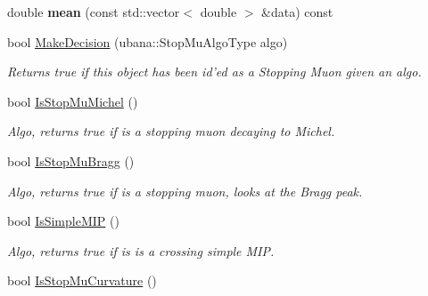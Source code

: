 \begin{DoxyCompactItemize}
\item 
\hypertarget{classubana_1_1StoppingMuonTaggerHelper_ae91e9aa900337fdda6efc20197fae907}{double {\bfseries mean} (const std\-::vector$<$ double $>$ \&data) const }\label{classubana_1_1StoppingMuonTaggerHelper_ae91e9aa900337fdda6efc20197fae907}

\item 
\hypertarget{classubana_1_1StoppingMuonTaggerHelper_af00c8b25be8b4f8bed8a0110133cef32}{bool \hyperlink{classubana_1_1StoppingMuonTaggerHelper_af00c8b25be8b4f8bed8a0110133cef32}{Make\-Decision} (ubana\-::\-Stop\-Mu\-Algo\-Type algo)}\label{classubana_1_1StoppingMuonTaggerHelper_af00c8b25be8b4f8bed8a0110133cef32}

\begin{DoxyCompactList}\small\item\em Returns true if this object has been id'ed as a Stopping Muon given an algo. \end{DoxyCompactList}\item 
\hypertarget{classubana_1_1StoppingMuonTaggerHelper_a577c1e215894beade40f3016f1281a2a}{bool \hyperlink{classubana_1_1StoppingMuonTaggerHelper_a577c1e215894beade40f3016f1281a2a}{Is\-Stop\-Mu\-Michel} ()}\label{classubana_1_1StoppingMuonTaggerHelper_a577c1e215894beade40f3016f1281a2a}

\begin{DoxyCompactList}\small\item\em Algo, returns true if is a stopping muon decaying to Michel. \end{DoxyCompactList}\item 
\hypertarget{classubana_1_1StoppingMuonTaggerHelper_a3ca72062c233ffa1dea221ceecebea25}{bool \hyperlink{classubana_1_1StoppingMuonTaggerHelper_a3ca72062c233ffa1dea221ceecebea25}{Is\-Stop\-Mu\-Bragg} ()}\label{classubana_1_1StoppingMuonTaggerHelper_a3ca72062c233ffa1dea221ceecebea25}

\begin{DoxyCompactList}\small\item\em Algo, returns true if is a stopping muon, looks at the Bragg peak. \end{DoxyCompactList}\item 
\hypertarget{classubana_1_1StoppingMuonTaggerHelper_a1b584e720c5a745f8b170139c1c6910b}{bool \hyperlink{classubana_1_1StoppingMuonTaggerHelper_a1b584e720c5a745f8b170139c1c6910b}{Is\-Simple\-M\-I\-P} ()}\label{classubana_1_1StoppingMuonTaggerHelper_a1b584e720c5a745f8b170139c1c6910b}

\begin{DoxyCompactList}\small\item\em Algo, returns true if is is a crossing simple M\-I\-P. \end{DoxyCompactList}\item 
\hypertarget{classubana_1_1StoppingMuonTaggerHelper_a7d10fc24ede20dfcf7474794c5c24746}{bool \hyperlink{classubana_1_1StoppingMuonTaggerHelper_a7d10fc24ede20dfcf7474794c5c24746}{Is\-Stop\-Mu\-Curvature} ()}\label{classubana_1_1StoppingMuonTaggerHelper_a7d10fc24ede20dfcf7474794c5c24746}


\end{DoxyCompactItemize}
